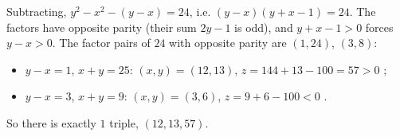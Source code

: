 Subtracting, $y^2-x^2-(y-x)=24$, i.e. $(y-x)(y+x-1)=24$. The factors have opposite parity (their sum $2y-1$ is odd), and $y+x-1>0$ forces $y-x>0$. The factor pairs of $24$ with opposite parity are $(1,24)$, $(3,8)$:
\begin{itemize}
\item $y-x=1$, $x+y=25$: $(x,y)=(12,13)$, $z=144+13-100=57>0$ \checkmark;
\item $y-x=3$, $x+y=9$: $(x,y)=(3,6)$, $z=9+6-100<0$ \texttimes.
\end{itemize}
So there is exactly $\boxed{1}$ triple, $(12,13,57)$.
